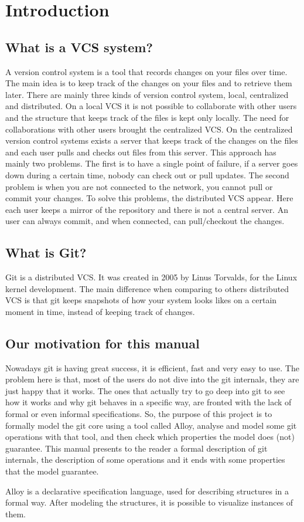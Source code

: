 \section{Introduction}
\subsection{What is a VCS system?}
A \Gls{version control system} is a tool that records changes on your
files over time. The main idea is to keep track of the changes on your
files and to retrieve them later. There are mainly three kinds of 
\Gls{version control system}, local, centralized and distributed. On
a local VCS it is not possible to collaborate with other users and
the structure that keeps track of the files is kept only locally. The
need for collaborations with other users brought the centralized VCS.
On the centralized version control systems exists a server that keeps
track of the changes on the files and each user pulls and checks out files
from this server. This approach has mainly two problems. The
first is to have a single point of failure, if a server goes down
during a certain time, nobody can check out or pull updates. The
second problem is when you are not connected to the network, you
cannot pull or commit your changes. To solve this problems, the
distributed VCS appear. Here each user keeps a mirror of the
repository and there is not a central server. An user can always commit,
and when connected, can pull/checkout the changes.\\
\subsection{What is Git?}
Git is a distributed VCS. It was created in 2005 by Linus Torvalds,
for the Linux kernel development. The main difference when comparing to
others distributed VCS is that git keeps snapshots of how your system
looks likes on a certain moment in time, instead of keeping track of
changes.\\
\subsection{Our motivation for this manual}
Nowadays git is having great success, it is efficient, fast and very
easy to use. The problem here is that, most of the users do not dive
into the git internals, they are just happy that it works. The ones
that actually try to go deep into git to see how it works and why git
behaves in a specific way, are fronted with the lack of formal or even
informal specifications.  So, the purpose of this project is to
formally model the git core using a tool called 
Alloy, analyse and model some git
operations with that tool, and then check which properties the model does (not)
guarantee. This manual presents to the reader a formal description of
git internals, the description of some operations and it ends with
some properties that the model guarantee.\par
Alloy is a declarative specification language, used for describing structures in 
a formal way. After modeling the structures, it is possible to visualize 
instances of them.

